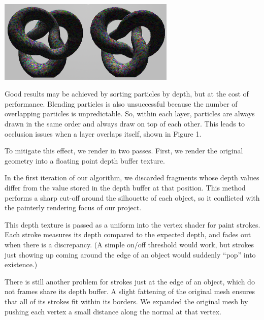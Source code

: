 \documentclass[conference]{acmsiggraph}
\begin{document}
\begin{minipage}{\linewidth}%
  \includegraphics[width=3.32in]{images/torus_depth_test_demo}
  \label{visina8}
\end{minipage}


Good results may be achieved by sorting particles by depth, but at the cost of
performance. Blending particles is also unsuccessful because the number of
overlapping particles is unpredictable. So, within each layer, particles are
always drawn in the same order and always draw on top of each other. This leads
to occlusion issues when a layer overlaps itself, shown in Figure 1.

To mitigate this effect, we render in two passes. First, we render the original
geometry into a floating point depth buffer texture.

In the first iteration of our algorithm, we discarded fragments whose depth
values differ from the value stored in the depth buffer at that position. This
method performs a sharp cut-off around the silhouette of each object, so it
conflicted with the painterly rendering focus of our project.

This depth texture is passed as a uniform into the vertex shader for paint
strokes. Each stroke measures its depth compared to the expected depth, and
fades out when there is a discrepancy. (A simple on/off threshold would work,
but strokes just showing up coming around the edge of an object would suddenly
``pop'' into existence.)

There is still another problem for strokes just at the edge of an object, which
do not frames share its depth buffer. A slight fattening of the original mesh
ensures that all of its strokes fit within its borders. We expanded the
original mesh by pushing each vertex a small distance along the normal at that
vertex.
\end{document}
